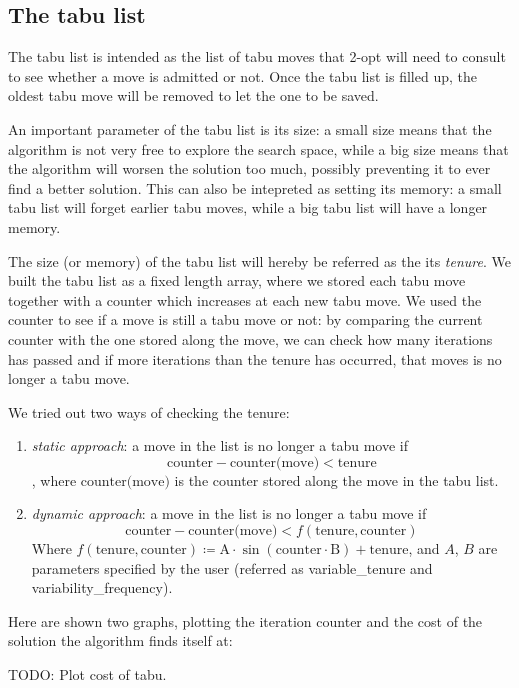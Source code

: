 \subsection{The tabu list}

The tabu list is intended as the list of tabu moves that 2-opt will need to consult to see whether a move is admitted or not. Once the tabu list is filled up, the oldest tabu move will be removed to let the one to be saved.

An important parameter of the tabu list is its size: a small size means that the algorithm is not very free to explore the search space, while a big size means that the algorithm will worsen the solution too much, possibly preventing it to ever find a better solution. This can also be intepreted as setting its memory: a small tabu list will forget earlier tabu moves, while a big tabu list will have a longer memory.

The size (or memory) of the tabu list will hereby be referred as the its \textit{tenure}. We built the tabu list as a fixed length array, where we stored each tabu move together with a counter which increases at each new tabu move. We used the counter to see if a move is still a tabu move or not: by comparing the current counter with the one stored along the move, we can check how many iterations has passed and if more iterations than the tenure has occurred, that moves is no longer a tabu move.

We tried out two ways of checking the tenure:

\begin{enumerate}
    \item \textit{static approach}: a move in the list is no longer a tabu move if
    $$\text{counter}-\text{counter(move)} < \text{tenure}$$,
    where $\text{counter(move)}$ is the counter stored along the move in the tabu list.
    \item \textit{dynamic approach}: a move in the list is no longer a tabu move if
    $$\text{counter}-\text{counter(move)} < f(\text{tenure}, \text{counter})$$
    Where $f(\text{tenure},\text{counter})\coloneq \text{A}\cdot\sin(\text{counter}\cdot\text{B}) + \text{tenure}$, and $A$, $B$ are parameters specified by the user (referred as variable\_tenure and variability\_frequency).
\end{enumerate}

Here are shown two graphs, plotting the iteration counter and the cost of the solution the algorithm finds itself at:

TODO: Plot cost of tabu.

